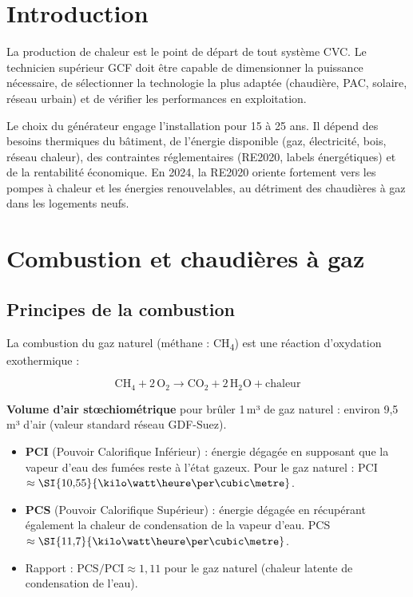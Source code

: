 \section{Introduction}

La production de chaleur est le point de départ de tout système CVC. Le technicien supérieur GCF doit être capable de dimensionner la puissance nécessaire, de sélectionner la technologie la plus adaptée (chaudière, PAC, solaire, réseau urbain) et de vérifier les performances en exploitation.

Le choix du générateur engage l'installation pour 15 à 25 ans. Il dépend des besoins thermiques du bâtiment, de l'énergie disponible (gaz, électricité, bois, réseau chaleur), des contraintes réglementaires (RE2020, labels énergétiques) et de la rentabilité économique. En 2024, la RE2020 oriente fortement vers les pompes à chaleur et les énergies renouvelables, au détriment des chaudières à gaz dans les logements neufs.

\section{Combustion et chaudières à gaz}

\subsection{Principes de la combustion}

La combustion du gaz naturel (méthane : CH\textsubscript{4}) est une réaction d'oxydation exothermique :

\begin{equation}
  \text{CH}_4 + 2\,\text{O}_2 \rightarrow \text{CO}_2 + 2\,\text{H}_2\text{O} + \text{chaleur}
\end{equation}

\textbf{Volume d'air stœchiométrique} pour brûler 1\,m³ de gaz naturel : environ 9,5\,m³ d'air (valeur standard réseau GDF-Suez).

\begin{definition}[title=Pouvoir calorifique]
\begin{itemize}
  \item \textbf{PCI} (Pouvoir Calorifique Inférieur) : énergie dégagée en supposant que la vapeur d'eau des fumées reste à l'état gazeux. Pour le gaz naturel : PCI $\approx \SI{10{,}55}{\kilo\watt\heure\per\cubic\metre}$.
  \item \textbf{PCS} (Pouvoir Calorifique Supérieur) : énergie dégagée en récupérant également la chaleur de condensation de la vapeur d'eau. PCS $\approx \SI{11{,}7}{\kilo\watt\heure\per\cubic\metre}$.
  \item Rapport : $\text{PCS} / \text{PCI} \approx 1{,}11$ pour le gaz naturel (chaleur latente de condensation de l'eau).
\end{itemize}
\end{definition}

